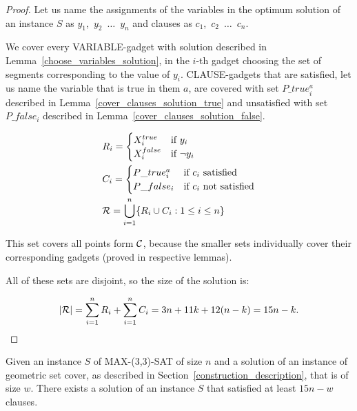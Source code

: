 \begin{proof}
Let us name the assignments of the variables in
the optimum solution of an instance $S$ as
$y_1$,~$y_2$~$\ldots$~$y_n$ and clauses as
$c_1$,~$c_2$~$\ldots$~$c_n$.


We cover every VARIABLE-gadget with solution described in
Lemma~\ref{choose_variables_solution},
in the $i$-th gadget choosing the set of segments corresponding to the
value of $y_i$. 
CLAUSE-gadgets that are satisfied,
let us name the variable that is true in them $a$,
are covered with set $P\_true_i^a$ described in
Lemma~\ref{cover_clauses_solution_true}
and unsatisfied with set $P\_false_i$ described in
Lemma~\ref{cover_clauses_solution_false}.


\begin{align}
	\begin{split}
	& R_i = \begin{cases}
		X_i^{true} & \text{if}\ y_i \\
		X_i^{false} & \text{if}\ \neg y_i
		\end{cases} \\
	& C_i = \begin{cases}
		P\_true_i^a & \text{if}\ c_i \text{ satisfied} \\
		P\_false_i & \text{if}\ c_i \text{ not satisfied}
		\end{cases} \\
	& \mathcal{R} = \bigcup\limits_{i=1}^{n} \{R_i \cup C_i : 1 \le i \le n\}
    \end{split}
\end{align}


This set covers all points form $\mathcal{C}$, because
the smaller sets individually cover their corresponding gadgets
(proved in respective lemmas).

All of these sets are disjoint, so the size of the solution is:

$$|\mathcal{R}| = \sum_{i=1}^{n} R_i + \sum_{i=1}^n C_i = 3n + 11k + 12(n-k) = 15n - k.$$
\end{proof}
\begin{lemma}
	\label{construction_completness}
	Given an instance $S$ of MAX-(3,3)-SAT of size $n$
	and a solution of an instance of geometric set cover,
	as described in Section~\ref{construction_description},
	that is of size $w$.
	There exists a solution of an instance $S$
	that satisfied at least $15n - w$ clauses.
\end{lemma}

